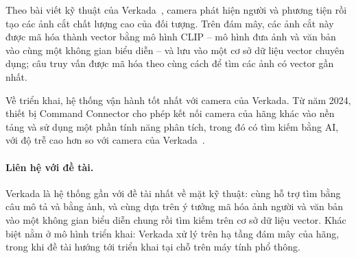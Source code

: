 Theo bài viết kỹ thuật của Verkada~\cite{verkada2025scaling}, camera phát hiện người và phương tiện rồi tạo các ảnh cắt chất lượng cao của đối tượng. Trên đám mây, các ảnh cắt này được mã hóa thành vector bằng mô hình CLIP -- mô hình đưa ảnh và văn bản vào cùng một không gian biểu diễn -- và lưu vào một cơ sở dữ liệu vector chuyên dụng; câu truy vấn được mã hóa theo cùng cách để tìm các ảnh có vector gần nhất.

Về triển khai, hệ thống vận hành tốt nhất với camera của Verkada. Từ năm 2024, thiết bị Command Connector cho phép kết nối camera của hãng khác vào nền tảng và sử dụng một phần tính năng phân tích, trong đó có tìm kiếm bằng AI, với độ trễ cao hơn so với camera của Verkada~\cite{verkada2024connector}.

\paragraph{Liên hệ với đề tài.} Verkada là hệ thống gần với đề tài nhất về mặt kỹ thuật: cùng hỗ trợ tìm bằng câu mô tả và bằng ảnh, và cùng dựa trên ý tưởng mã hóa ảnh người và văn bản vào một không gian biểu diễn chung rồi tìm kiếm trên cơ sở dữ liệu vector. Khác biệt nằm ở mô hình triển khai: Verkada xử lý trên hạ tầng đám mây của hãng, trong khi đề tài hướng tới triển khai tại chỗ trên máy tính phổ thông.
